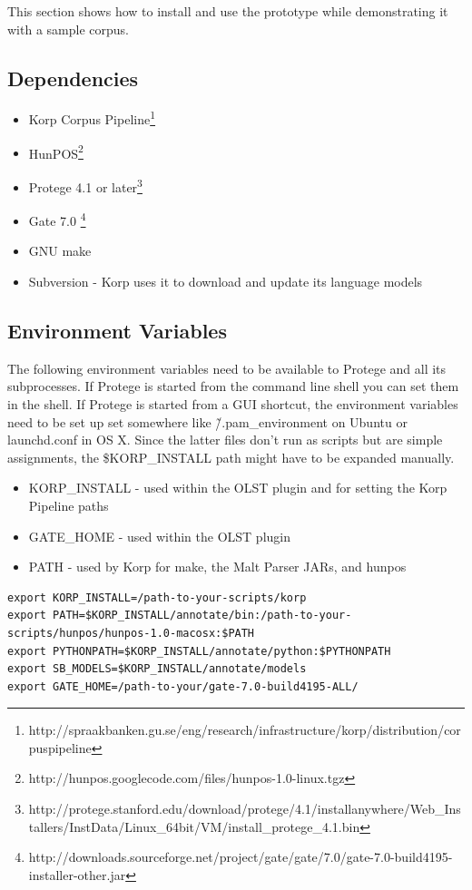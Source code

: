 \documentclass[a4paper]{report}
\begin{document}
This section shows how to install and use the prototype while demonstrating it with a sample corpus.

\subsection{Dependencies}

\begin{itemize}
\item Korp Corpus Pipeline\footnote{http://spraakbanken.gu.se/eng/research/infrastructure/korp/distribution/corpuspipeline}
\item HunPOS\footnote{http://hunpos.googlecode.com/files/hunpos-1.0-linux.tgz}
\item Protege 4.1 or later\footnote{http://protege.stanford.edu/download/protege/4.1/installanywhere/Web\_Installers/InstData/Linux\_64bit/VM/install\_protege\_4.1.bin}
\item Gate 7.0 \footnote{http://downloads.sourceforge.net/project/gate/gate/7.0/gate-7.0-build4195-installer-other.jar}
\item GNU make
\item Subversion - Korp uses it to download and update its language models
\end{itemize}

\subsection{Environment Variables}

The following environment variables need to be available to Protege and all its subprocesses.
If Protege is started from the command line shell you can set them in the shell.
If Protege is started from a GUI shortcut, the environment variables need to be set up set somewhere like \~/.pam\_environment on Ubuntu or launchd.conf in OS X.
Since the latter files don't run as scripts but are simple assignments, the \$KORP\_INSTALL path might have to be expanded manually.

\begin{itemize}
\item KORP\_INSTALL - used within the OLST plugin and for setting the Korp Pipeline paths
\item GATE\_HOME - used within the OLST plugin
\item PATH - used by Korp for make, the Malt Parser JARs, and hunpos      
\end{itemize}

\begin{Code}
\begin{lstlisting}[frame=single]
export KORP_INSTALL=/path-to-your-scripts/korp
export PATH=$KORP_INSTALL/annotate/bin:/path-to-your-scripts/hunpos/hunpos-1.0-macosx:$PATH
export PYTHONPATH=$KORP_INSTALL/annotate/python:$PYTHONPATH
export SB_MODELS=$KORP_INSTALL/annotate/models
export GATE_HOME=/path-to-your/gate-7.0-build4195-ALL/
\end{lstlisting}
\end{Code}
\end{document}
